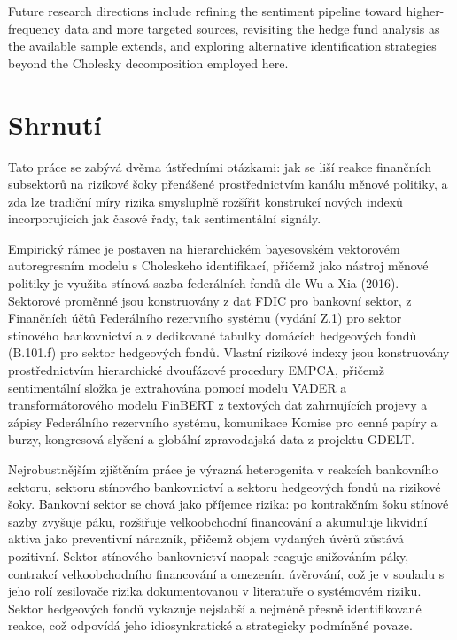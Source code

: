 \documentclass[12pt,a4paper]{report}
\begin{document}
Future research directions include refining the sentiment pipeline toward higher-frequency data and more targeted sources, revisiting the hedge fund analysis as the available sample extends, and exploring alternative identification strategies beyond the Cholesky decomposition employed here.
\chapter*{Shrnut\'{i}}

Tato práce se zabývá dvěma ústředními otázkami: jak se liší reakce finančních subsektorů na rizikové šoky přenášené prostřednictvím kanálu měnové politiky, a zda lze tradiční míry rizika smysluplně rozšířit konstrukcí nových indexů incorporujících jak časové řady, tak sentimentální signály.

Empirický rámec je postaven na hierarchickém bayesovském vektorovém autoregresním modelu s Choleskeho identifikací, přičemž jako nástroj měnové politiky je využita stínová sazba federálních fondů dle Wu a Xia (2016). Sektorové proměnné jsou konstruovány z dat FDIC pro bankovní sektor, z Finančních účtů Federálního rezervního systému (vydání Z.1) pro sektor stínového bankovnictví a z dedikované tabulky domácích hedgeových fondů (B.101.f) pro sektor hedgeových fondů. Vlastní rizikové indexy jsou konstruovány prostřednictvím hierarchické dvoufázové procedury EMPCA, přičemž sentimentální složka je extrahována pomocí modelu VADER a transformátorového modelu FinBERT z textových dat zahrnujících projevy a zápisy Federálního rezervního systému, komunikace Komise pro cenné papíry a burzy, kongresová slyšení a globální zpravodajská data z projektu GDELT.

Nejrobustnějším zjištěním práce je výrazná heterogenita v reakcích bankovního sektoru, sektoru stínového bankovnictví a sektoru hedgeových fondů na rizikové šoky. Bankovní sektor se chová jako příjemce rizika: po kontrakčním šoku stínové sazby zvyšuje páku, rozšiřuje velkoobchodní financování a akumuluje likvidní aktiva jako preventivní nárazník, přičemž objem vydaných úvěrů zůstává pozitivní. Sektor stínového bankovnictví naopak reaguje snižováním páky, contrakcí velkoobchodního financování a omezením úvěrování, což je v souladu s jeho rolí zesilovače rizika dokumentovanou v literatuře o systémovém riziku. Sektor hedgeových fondů vykazuje nejslabší a nejméně přesně identifikované reakce, což odpovídá jeho idiosynkratické a strategicky podmíněné povaze.
\end{document}
